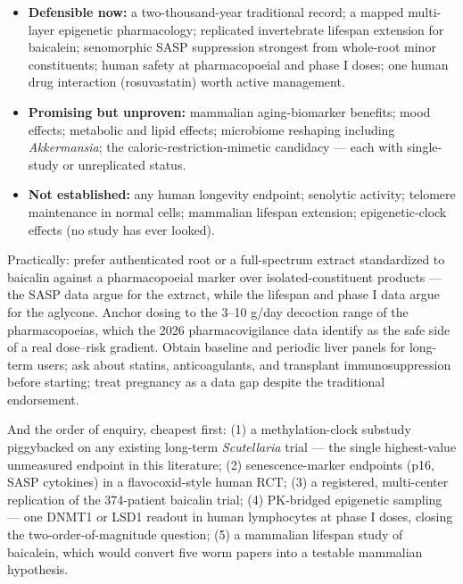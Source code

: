 \begin{itemize}[leftmargin=1.4em]
\item \textbf{Defensible now:} a two-thousand-year traditional record; a mapped multi-layer epigenetic pharmacology; replicated invertebrate lifespan extension for baicalein; senomorphic SASP suppression strongest from whole-root minor constituents; human safety at pharmacopoeial and phase I doses; one human drug interaction (rosuvastatin) worth active management.
\item \textbf{Promising but unproven:} mammalian aging-biomarker benefits; mood effects; metabolic and lipid effects; microbiome reshaping including \textit{Akkermansia}; the caloric-restriction-mimetic candidacy --- each with single-study or unreplicated status.
\item \textbf{Not established:} any human longevity endpoint; senolytic activity; telomere maintenance in normal cells; mammalian lifespan extension; epigenetic-clock effects (no study has ever looked).
\end{itemize}

Practically: prefer authenticated root or a full-spectrum extract standardized to baicalin against a pharmacopoeial marker over isolated-constituent products --- the SASP data argue for the extract, while the lifespan and phase I data argue for the aglycone. Anchor dosing to the 3--10 g/day decoction range of the pharmacopoeias, which the 2026 pharmacovigilance data identify as the safe side of a real dose--risk gradient. Obtain baseline and periodic liver panels for long-term users; ask about statins, anticoagulants, and transplant immunosuppression before starting; treat pregnancy as a data gap despite the traditional endorsement.

And the order of enquiry, cheapest first: (1) a methylation-clock substudy piggybacked on any existing long-term \textit{Scutellaria} trial --- the single highest-value unmeasured endpoint in this literature; (2) senescence-marker endpoints (p16, SASP cytokines) in a flavocoxid-style human RCT; (3) a registered, multi-center replication of the 374-patient baicalin trial; (4) PK-bridged epigenetic sampling --- one DNMT1 or LSD1 readout in human lymphocytes at phase I doses, closing the two-order-of-magnitude question; (5) a mammalian lifespan study of baicalein, which would convert five worm papers into a testable mammalian hypothesis.

